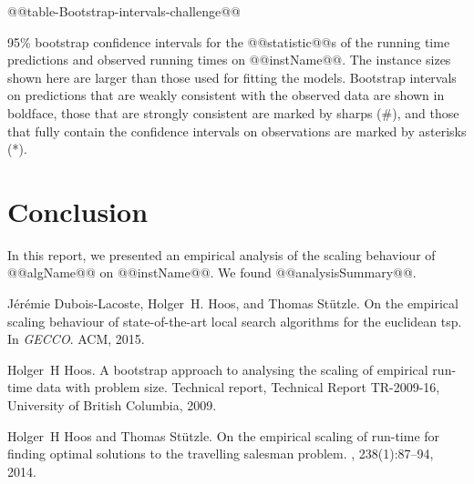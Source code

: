 \begin{table*}[tb]
\noindent \begin{centering}
@@table-Bootstrap-intervals-challenge@@
% 
\par\end{centering}

\caption{\label{tab:Bootstrap-intervals-challenge} 95\% bootstrap confidence intervals
for the @@statistic@@s of the  running time predictions and observed running times on @@instName@@. 
The instance sizes shown here are larger than those used for fitting the models.
Bootstrap intervals on predictions that are weakly consistent
with the observed data are shown in boldface,
those that are strongly consistent are marked
by sharps ({\#}),
and those that fully contain the confidence intervals on 
observations are marked by asterisks ({*}).}
\end{table*}


\section{Conclusion}

In this report, we presented an empirical analysis of the scaling
behaviour of @@algName@@ on @@instName@@. We found
@@analysisSummary@@.


\begin{thebibliography}{1}

J{\'e}r{\'e}mie Dubois-Lacoste, Holger~H. Hoos, and Thomas St{\"u}tzle.
\newblock On the empirical scaling behaviour of state-of-the-art local search
  algorithms for the euclidean tsp.
\newblock In {\em GECCO}. ACM, 2015.

Holger~H Hoos.
\newblock A bootstrap approach to analysing the scaling of empirical run-time
  data with problem size.
\newblock Technical report, Technical Report TR-2009-16, University of British
  Columbia, 2009.

Holger~H Hoos and Thomas St{\"u}tzle.
\newblock On the empirical scaling of run-time for finding optimal solutions to
  the travelling salesman problem.
, 238(1):87--94, 2014.

\end{thebibliography}


